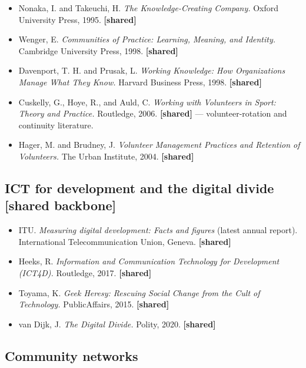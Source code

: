 \begin{itemize}
\tightlist
\item
  Nonaka, I. and Takeuchi, H. \emph{The Knowledge-Creating Company.}
  Oxford University Press, 1995. \textbf{{[}shared{]}}
\item
  Wenger, E. \emph{Communities of Practice: Learning, Meaning, and
  Identity.} Cambridge University Press, 1998. \textbf{{[}shared{]}}
\item
  Davenport, T. H. and Prusak, L. \emph{Working Knowledge: How
  Organizations Manage What They Know.} Harvard Business Press, 1998.
  \textbf{{[}shared{]}}
\item
  Cuskelly, G., Hoye, R., and Auld, C. \emph{Working with Volunteers in
  Sport: Theory and Practice.} Routledge, 2006. \textbf{{[}shared{]}}
  --- volunteer-rotation and continuity literature.
\item
  Hager, M. and Brudney, J. \emph{Volunteer Management Practices and
  Retention of Volunteers.} The Urban Institute, 2004.
  \textbf{{[}shared{]}}
\end{itemize}

\hypertarget{ict-for-development-and-the-digital-divide-shared-backbone}{%
\subsection{ICT for development and the digital divide {[}shared
backbone{]}}\label{ict-for-development-and-the-digital-divide-shared-backbone}}

\begin{itemize}
\tightlist
\item
  ITU. \emph{Measuring digital development: Facts and figures} (latest
  annual report). International Telecommunication Union, Geneva.
  \textbf{{[}shared{]}}
\item
  Heeks, R. \emph{Information and Communication Technology for
  Development (ICT4D).} Routledge, 2017. \textbf{{[}shared{]}}
\item
  Toyama, K. \emph{Geek Heresy: Rescuing Social Change from the Cult of
  Technology.} PublicAffairs, 2015. \textbf{{[}shared{]}}
\item
  van Dijk, J. \emph{The Digital Divide.} Polity, 2020.
  \textbf{{[}shared{]}}
\end{itemize}

\hypertarget{community-networks}{%
\subsection{Community networks}\label{community-networks}}

